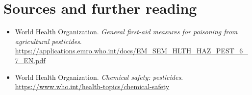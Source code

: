 \section*{Sources and further reading}
\begin{itemize}
\item World Health Organization. \textit{General first-aid measures for poisoning from agricultural pesticides}. \url{https://applications.emro.who.int/docs/EM_SEM_HLTH_HAZ_PEST_6_7_EN.pdf}
\item World Health Organization. \textit{Chemical safety: pesticides}. \url{https://www.who.int/health-topics/chemical-safety}
\end{itemize}
